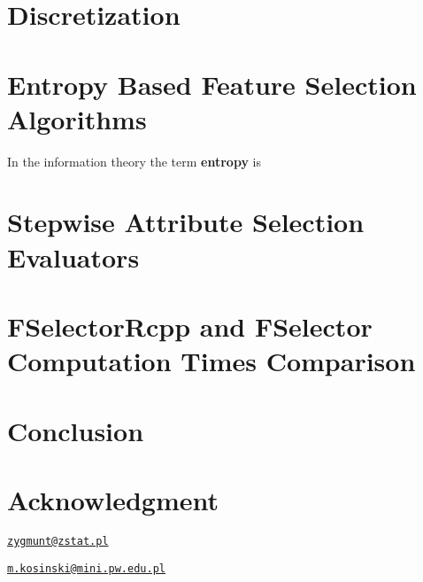 \section{Discretization}\label{discretization}

\section{Entropy Based Feature Selection
Algorithms}\label{entropy-based-feature-selection-algorithms}

In the information theory the term \textbf{entropy}
\citep{Shannon:2001:MTC:584091.584093} is

\section{Stepwise Attribute Selection
Evaluators}\label{stepwise-attribute-selection-evaluators}

\section{FSelectorRcpp and FSelector Computation Times
Comparison}\label{fselectorrcpp-and-fselector-computation-times-comparison}

\section{Conclusion}\label{conclusion}

\section{Acknowledgment}\label{acknowledgment}



\address{%
Zygmunt Zawadzki\\
\\
\\
}
\href{mailto:zygmunt@zstat.pl}{\nolinkurl{zygmunt@zstat.pl}}

\address{%
Marcin Kosiński\\
Warsaw Univeristy of Technology\\
Faculty of Mathematics and Information Science\\ Koszykowa 75, Warsaw Poland\\
}
\href{mailto:m.kosinski@mini.pw.edu.pl}{\nolinkurl{m.kosinski@mini.pw.edu.pl}}

